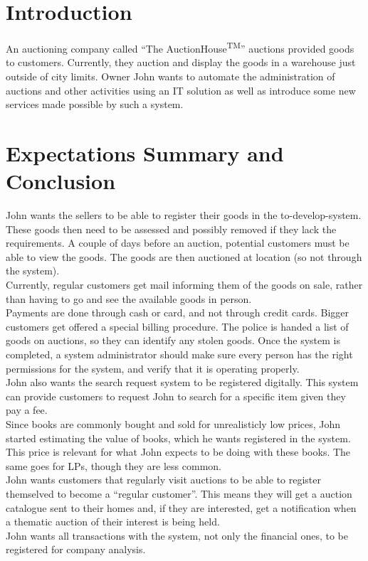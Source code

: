 \section{Introduction}
An auctioning company called ``The AuctionHouse\textsuperscript{TM}'' auctions provided goods to customers. Currently, they auction and display the goods in a warehouse just outside of city limits. Owner John wants to automate the administration of auctions and other activities using an IT solution as well as introduce some new services made possible by such a system.

\section{Expectations Summary and Conclusion}
John wants the sellers to be able to register their goods in the to-develop-system. These goods then need to be assessed and possibly removed if they lack the requirements. A couple of days before an auction, potential customers must be able to view the goods. The goods are then auctioned at location (so not through the system).\\
Currently, regular customers get mail informing them of the goods on sale, rather than having to go and see the available goods in person.\\
Payments are done through cash or card, and not through credit cards. Bigger customers get offered a special billing procedure.
The police is handed a list of goods on auctions, so they can identify any stolen goods.
Once the system is completed, a system administrator should make sure every person has the right permissions for the system, and verify that it is operating properly.\\
John also wants the search request system to be registered digitally. This system can provide customers to request John to search for a specific item given they pay a fee.\\
Since books are commonly bought and sold for unrealisticly low prices, John started estimating the value of books, which he wants registered in the system. This price is relevant for what John expects to be doing with these books. The same goes for LPs, though they are less common.\\
John wants customers that regularly visit auctions to be able to register themselved to become a ``regular customer''. This means they will get a auction catalogue sent to their homes and, if they are interested, get a notification when a thematic auction of their interest is being held.\\
John wants all transactions with the system, not only the financial ones, to be registered for company analysis.

